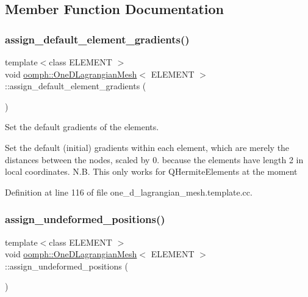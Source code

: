 \subsection{Member Function Documentation}
\mbox{\label{classoomph_1_1OneDLagrangianMesh_a7a4eabf4901a90b3015d2620fc70f648}} 
\subsubsection{\texorpdfstring{assign\+\_\+default\+\_\+element\+\_\+gradients()}{assign\_default\_element\_gradients()}}
{\footnotesize\ttfamily template$<$class E\+L\+E\+M\+E\+NT $>$ \\
void \hyperlink{classoomph_1_1OneDLagrangianMesh}{oomph\+::\+One\+D\+Lagrangian\+Mesh}$<$ E\+L\+E\+M\+E\+NT $>$\+::assign\+\_\+default\+\_\+element\+\_\+gradients (\begin{DoxyParamCaption}{ }\end{DoxyParamCaption})\hspace{0.3cm}{\ttfamily [private]}}



Set the default gradients of the elements. 

Set the default (initial) gradients within each element, which are merely the distances between the nodes, scaled by 0. because the elements have length 2 in local coordinates. N.\+B. This only works for Q\+Hermite\+Elements at the moment 

Definition at line 116 of file one\+\_\+d\+\_\+lagrangian\+\_\+mesh.\+template.\+cc.

\mbox{\label{classoomph_1_1OneDLagrangianMesh_a1eebb0eddd75a7c2847615c05b5fb4d8}} 
\subsubsection{\texorpdfstring{assign\+\_\+undeformed\+\_\+positions()}{assign\_undeformed\_positions()}}
{\footnotesize\ttfamily template$<$class E\+L\+E\+M\+E\+NT $>$ \\
void \hyperlink{classoomph_1_1OneDLagrangianMesh}{oomph\+::\+One\+D\+Lagrangian\+Mesh}$<$ E\+L\+E\+M\+E\+NT $>$\+::assign\+\_\+undeformed\+\_\+positions (\begin{DoxyParamCaption}{ }\end{DoxyParamCaption})\hspace{0.3cm}{\ttfamily [private]}}



